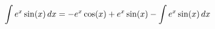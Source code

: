 \documentclass[preview]{standalone}
\begin{document}
\begin{align*}
\special{dvisvgm:raw <g id='unique000'>}\int e^x \sin(x) \, dx = -e^x \cos(x) + e^x \sin(x) - \int e^x \sin(x) \, dx\special{dvisvgm:raw </g>}
\end{align*}
\end{document}
